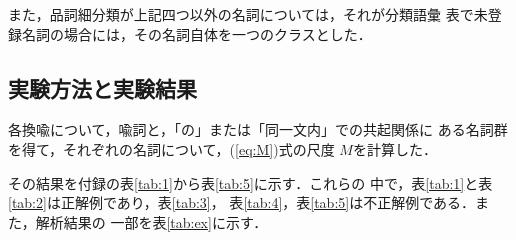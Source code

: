 また，品詞細分類が上記四つ以外の名詞については，それが分類語彙
表で未登録名詞の場合には，その名詞自体を一つのクラスとした．
\vspace{-3mm}
\subsection{実験方法と実験結果}
\label{sec:results}

各換喩について，喩詞と，「の」または「同一文内」での共起関係に
ある名詞群を得て，それぞれの名詞について，(\ref{eq:M})式の尺度
$M$を計算した．

その結果を付録の表\ref{tab:1}から表\ref{tab:5}に示す．これらの
中で，表\ref{tab:1}と表\ref{tab:2}は正解例であり，表\ref{tab:3}，
表\ref{tab:4}，表\ref{tab:5}は不正解例である．また，解析結果の
一部を表\ref{tab:ex}に示す．

